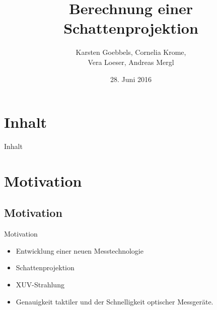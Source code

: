\documentclass[compress]{beamer}
\title{\textcolor{RWTHblue}{\textbf{Berechnung einer Schattenprojektion}}}
\institute[FH Aachen]{\textbf{Vortrag}\\ \vspace{0.25cm} \tiny{Fachhochschule Aachen, Standort Jülich\\Studiengang: Technomathematik}
}
\author{Karsten Goebbels, Cornelia Krome, \\ Vera Loeser, Andreas Mergl}
\date{28. Juni 2016}
\begin{document}

\maketitle

\section*{Inhalt}
\begin{frame}{Inhalt}
	\begin{minipage}{0.43\linewidth}
		\tableofcontents[hideallsubsections]
	\end{minipage}
	\hspace*{0.05\linewidth}
\end{frame}

\section{Motivation}
\subsection{Motivation}
\begin{frame}{Motivation}
	\begin{itemize}
		\item Entwicklung einer neuen Messtechnologie
		\item Schattenprojektion
		\item XUV-Strahlung 
		\item Genauigkeit taktiler und der Schnelligkeit optischer Messgeräte.
	\end{itemize}
\end{frame}
\end{document}
